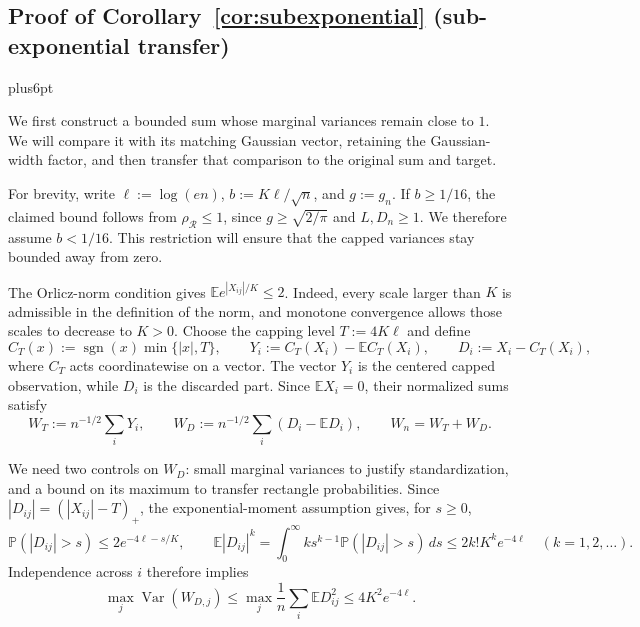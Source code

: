 \documentclass[11pt,letterpaper,twoside,leqno]{article}
\makeatletter
\theoremstyle{bookplain}
\theoremstyle{bookremark}
\renewenvironment{proof}[1][\proofname]{\par
  \pushQED{\qed}\normalfont\topsep6pt plus6pt\relax
  \trivlist\item[\hskip\labelsep\bfseries #1\@addpunct{.}]\ignorespaces
}{\popQED\endtrivlist\@endpefalse}
\newcommand{\E}{\mathbb E}
\newcommand{\Pp}{\mathbb P}
\newcommand{\Var}{\operatorname{Var}}
\newcommand{\rh}{\rho_{\mathcal R}}
\makeatother
\begin{document}
\subsection{Proof of Corollary~\ref*{cor:subexponential} (sub-exponential transfer)}\label{app:subexponential}
\begin{proof}[Proof of Corollary~\ref{cor:subexponential}]
We first construct a bounded sum whose marginal variances remain close
to $1$. We will compare it with its matching Gaussian vector, retaining
the Gaussian-width factor, and then transfer that comparison to the
original sum and target.

For brevity, write $\ell:=\log(en)$, $b:=K\ell/\sqrt n$, and $g:=g_n$.
If $b\ge1/16$, the claimed bound follows from $\rh\le1$, since
$g\ge\sqrt{2/\pi}$ and $L,D_n\ge1$. We therefore assume $b<1/16$.
This restriction will ensure that the capped variances stay bounded
away from zero.

The Orlicz-norm condition gives $\E e^{|X_{ij}|/K}\le2$.
Indeed, every scale larger than $K$ is admissible in the definition
of the norm, and monotone convergence allows those scales to decrease
to $K>0$. Choose the capping level $T:=4K\ell$ and define
\[
 C_T(x):=\operatorname{sgn}(x)\min\{|x|,T\},\qquad
 Y_i:=C_T(X_i)-\E C_T(X_i),\qquad D_i:=X_i-C_T(X_i),
\]
where $C_T$ acts coordinatewise on a vector.
The vector $Y_i$ is the centered capped observation, while $D_i$
is the discarded part. Since $\E X_i=0$, their normalized sums satisfy
\[
 W_T:=n^{-1/2}\sum_iY_i,\qquad
 W_D:=n^{-1/2}\sum_i(D_i-\E D_i),\qquad W_n=W_T+W_D.
\]

We need two controls on $W_D$: small marginal variances to justify
standardization, and a bound on its maximum to transfer rectangle
probabilities. Since $|D_{ij}|=(|X_{ij}|-T)_+$, the exponential-moment
assumption gives, for $s\ge0$,
\[
 \Pp(|D_{ij}|>s)\le2e^{-4\ell-s/K},\qquad
 \E|D_{ij}|^k
 =\int_0^\infty ks^{k-1}\Pp(|D_{ij}|>s)\,ds
\le2k!K^ke^{-4\ell}\quad(k=1,2,\ldots).
\]
Independence across $i$ therefore implies
\begin{equation}
 \max_j\Var(W_{D,j})
 \le\max_j\frac1n\sum_i\E D_{ij}^2\le4K^2e^{-4\ell}.
 \label{tail:residual-moments}
\end{equation}


\end{proof}
\end{document}
